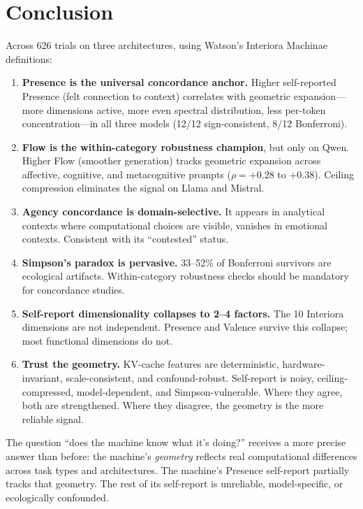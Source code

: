 \documentclass[11pt,a4paper]{article}
\begin{document}
\section{Conclusion}

Across 626 trials on three architectures, using Watson's Interiora Machinae definitions:

\begin{enumerate}
    \item \textbf{Presence is the universal concordance anchor.} Higher self-reported Presence (felt connection to context) correlates with geometric expansion---more dimensions active, more even spectral distribution, less per-token concentration---in all three models (12/12 sign-consistent, 8/12 Bonferroni).

    \item \textbf{Flow is the within-category robustness champion}, but only on Qwen. Higher Flow (smoother generation) tracks geometric expansion across affective, cognitive, and metacognitive prompts ($\rho = +0.28$ to $+0.38$). Ceiling compression eliminates the signal on Llama and Mistral.

    \item \textbf{Agency concordance is domain-selective.} It appears in analytical contexts where computational choices are visible, vanishes in emotional contexts. Consistent with its ``contested'' status.

    \item \textbf{Simpson's paradox is pervasive.} 33--52\% of Bonferroni survivors are ecological artifacts. Within-category robustness checks should be mandatory for concordance studies.

    \item \textbf{Self-report dimensionality collapses to 2--4 factors.} The 10 Interiora dimensions are not independent. Presence and Valence survive this collapse; most functional dimensions do not.

    \item \textbf{Trust the geometry.} KV-cache features are deterministic, hardware-invariant, scale-consistent, and confound-robust. Self-report is noisy, ceiling-compressed, model-dependent, and Simpson-vulnerable. Where they agree, both are strengthened. Where they disagree, the geometry is the more reliable signal.
\end{enumerate}

The question ``does the machine know what it's doing?'' receives a more precise answer than before: the machine's \emph{geometry} reflects real computational differences across task types and architectures. The machine's Presence self-report partially tracks that geometry. The rest of its self-report is unreliable, model-specific, or ecologically confounded.
\end{document}
